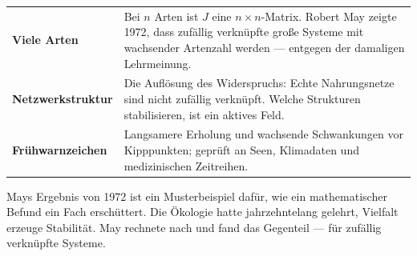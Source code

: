 \begin{forschung}
\begin{center}
{\small
\renewcommand{\arraystretch}{1.45}
\begin{tabular}{@{}P{2.8cm}P{5.4cm}@{}}
\toprule
\textbf{Viele Arten} & Bei $n$ Arten ist $J$ eine $n\times n$-Matrix. Robert May zeigte 1972, dass zufällig verknüpfte große Systeme mit wachsender Artenzahl  werden --- entgegen der damaligen Lehrmeinung.\\
\textbf{Netzwerk\-struktur} & Die Auflösung des Widerspruchs: Echte Nahrungsnetze sind nicht zufällig verknüpft. Welche Strukturen stabilisieren, ist ein aktives Feld.\\
\textbf{Frühwarnzeichen} & Langsamere Erholung und wachsende Schwankungen vor Kipppunkten; geprüft an Seen, Klimadaten und medizinischen Zeitreihen.\\
\bottomrule
\end{tabular}}
\end{center}

Mays Ergebnis von 1972 ist ein Musterbeispiel dafür, wie ein mathematischer Befund ein Fach erschüttert. Die Ökologie hatte jahrzehntelang gelehrt, Vielfalt erzeuge Stabilität. May rechnete nach und fand das Gegenteil --- für zufällig verknüpfte Systeme.

\begin{center}
\begin{minipage}{0.88\textwidth}
\end{minipage}
\end{center}
\end{forschung}

